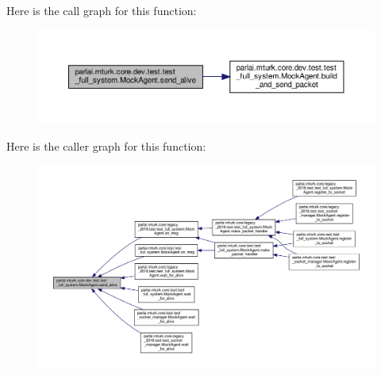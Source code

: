 Here is the call graph for this function\+:
\nopagebreak
\begin{figure}[H]
\begin{center}
\leavevmode
\includegraphics[width=350pt]{classparlai_1_1mturk_1_1core_1_1dev_1_1test_1_1test__full__system_1_1MockAgent_a2a8aaa90f95349b4de8517bfd6d010d6_cgraph}
\end{center}
\end{figure}
Here is the caller graph for this function\+:
\nopagebreak
\begin{figure}[H]
\begin{center}
\leavevmode
\includegraphics[width=350pt]{classparlai_1_1mturk_1_1core_1_1dev_1_1test_1_1test__full__system_1_1MockAgent_a2a8aaa90f95349b4de8517bfd6d010d6_icgraph}
\end{center}
\end{figure}
\mbox{\label{classparlai_1_1mturk_1_1core_1_1dev_1_1test_1_1test__full__system_1_1MockAgent_a0ae8ffc34c8a563239335eac90dfa9ac}} 
